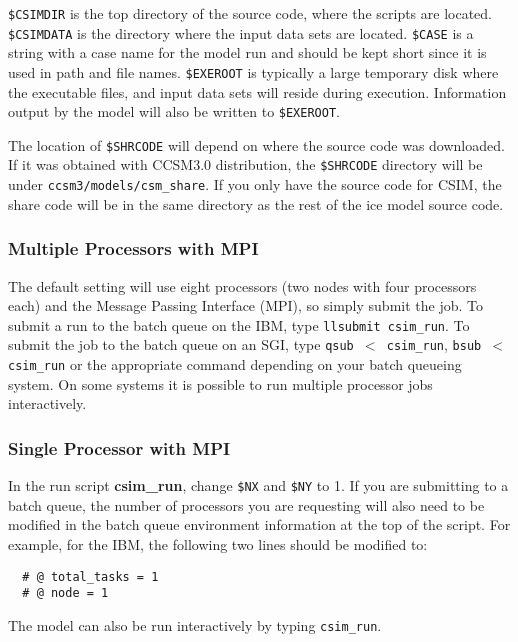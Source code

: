{\tt \$CSIMDIR} is the top directory of the source code, where the scripts are
located.  {\tt \$CSIMDATA} is the directory where the input data sets are located.
{\tt \$CASE} is a string with a case name for the model run and should be kept 
short since it is used in path and file names.  {\tt \$EXEROOT} is
typically a large temporary disk where the executable files,
and input data sets will reside during execution. Information output by the model
will also be written to {\tt \$EXEROOT}.  

The location of {\tt \$SHRCODE} will depend on where the source code was
downloaded.  If it was obtained with CCSM3.0 distribution, the {\tt \$SHRCODE}
directory will be under {\tt ccsm3/models/csm\_share}.  If you only have the
source code for CSIM, the share code will be in the same directory as the
rest of the ice model source code.

\subsubsection{Multiple Processors with MPI}

The default setting will use eight processors (two nodes with four processors
each) and the Message Passing Interface (MPI), so simply submit the job.  To
submit a run to the batch queue on the IBM, type 
{\tt llsubmit csim\_run}.  To submit the job to the batch queue on an SGI, type
{\tt qsub $<$ csim\_run}, {\tt bsub $<$ csim\_run} or the appropriate command
depending on your batch queueing system.  On some systems it is possible to 
run multiple processor jobs interactively.

\subsubsection{Single Processor with MPI}

In the run script {\bf csim\_run}, change {\tt \$NX} and {\tt \$NY} to 1.
If you are submitting to a batch queue, the number of processors you are
requesting will also need to be modified in the batch queue environment
information at the top of the script.  For example, for the IBM, the
following two lines should be modified to:

\begin{verbatim}
  # @ total_tasks = 1
  # @ node = 1
\end{verbatim}

The model can also be run interactively by typing {\tt csim\_run}.  

